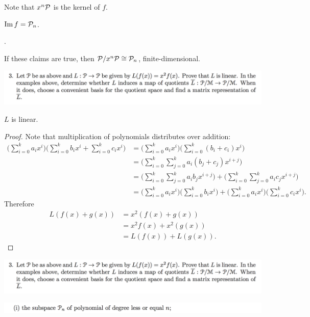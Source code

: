 \documentclass[12pt]{article}
\begin{document}
Note that $x^n\mathcal P$ is the kernel of $f$.

\begin{claim*}
  $\operatorname{\mathrm{Im}} f = \mathcal P_n$.
\end{claim*}

.

If these claims are true, then $\mathcal P/x^n\mathcal P \cong \mathcal P_n$, finite-dimensional.

\begin{mdframed}
\includegraphics[width=400pt]{img/linear-algebra-a0-2-3.png}
\end{mdframed}

\begin{claim*}
  $L$ is linear.
\end{claim*}

\begin{proof} Note that multiplication of polynomials distributes over addition:
  \begin{align*}
    \Big(\sum_{i=0}^k a_ix^i\Big)\Big(\sum_{i=0}^k b_ix^i + \sum_{i=0}^k c_ix^i\Big)
    &= \Big(\sum_{i=0}^k a_ix^i\Big)\Big(\sum_{i=0}^k (b_i + c_i)x^i\Big)\\
    &= \Big(\sum_{i=0}^{k}\sum_{j=0}^k a_i(b_j + c_j)x^{i+j}\Big)\\
    &= \Big(\sum_{i=0}^{k}\sum_{j=0}^k a_ib_jx^{i+j}\Big) +
       \Big(\sum_{i=0}^{k}\sum_{j=0}^k a_ic_jx^{i+j}\Big)\\
    &= \Big(\sum_{i=0}^k a_ix^i\Big)\Big(\sum_{i=0}^k b_ix^i\Big) +
       \Big(\sum_{i=0}^k a_ix^i\Big)\Big(\sum_{i=0}^k c_ix^i\Big).
  \end{align*}
  Therefore
  \begin{align*}
    L(f(x) + g(x)) &= x^2(f(x) + g(x))\\
                   &= x^2f(x) + x^2(g(x))\\
                   &= L(f(x)) + L(g(x)).
  \end{align*}
\end{proof}

\newpage
\begin{mdframed}
\includegraphics[width=400pt]{img/linear-algebra-a0-2-3.png}
\end{mdframed}
\begin{mdframed}
  \includegraphics[width=400pt]{img/linear-algebra-a0-2-2-1.png}
\end{mdframed}
\end{document}
